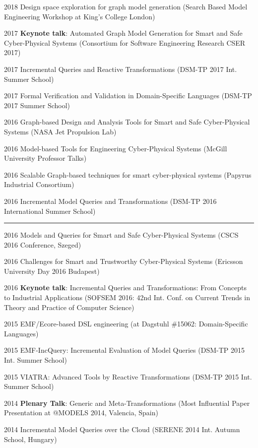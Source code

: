 \begin{yearlist}
\item[2018] Design space exploration for graph model generation  (Search Based Model Engineering Workshop at King's College London) 
\item[2017] \textbf{Keynote talk}: Automated Graph Model Generation for Smart and Safe Cyber-Physical Systems (Consortium for Software Engineering Research CSER 2017)
\item[2017] Incremental Queries and Reactive Transformations (DSM-TP 2017 Int. Summer School)
\item[2017] Formal Verification and Validation in Domain-Specific Languages (DSM-TP 2017 Summer School)
\item[2016] Graph-based  Design and Analysis Tools for Smart and Safe Cyber-Physical Systems (NASA Jet Propulsion Lab) 
\item[2016] Model-based Tools for Engineering Cyber-Physical Systems (McGill University Professor Talks)
\item[2016] Scalable  Graph-based techniques for smart cyber-physical systems (Papyrus Industrial Consortium)
\item[2016] Incremental Model Queries and Transformations (DSM-TP 2016 International Summer School) 
\newline
\rule{\linewidth}{0.2mm}
\item[2016] Models and Queries for Smart and Safe Cyber-Physical Systems (CSCS 2016 Conference, Szeged)
\item[2016] Challenges for Smart and Trustworthy Cyber-Physical Systems (Ericsson University Day 2016 Budapest)
\item[2016] \textbf{Keynote talk}: Incremental Queries and Transformations: From Concepts to Industrial Applications  (SOFSEM 2016: 42nd Int. Conf. on Current Trends in Theory and Practice of Computer Science) 
\item[2015] EMF/Ecore-based DSL engineering (at Dagstuhl \#15062:  Domain-Specific Languages)
\item[2015] EMF-IncQuery: Incremental Evaluation of Model Queries (DSM-TP 2015 Int. Summer School)  
\item[2015] VIATRA: Advanced Tools by Reactive Transformations (DSM-TP 2015 Int. Summer School) 
\item[2014] \textbf{Plenary Talk}: Generic and Meta-Transformations (Most Influential Paper Presentation at @MODELS 2014, Valencia, Spain)
\item[2014] Incremental Model Queries over the Cloud (SERENE 2014 Int. Autumn School, Hungary)

\end{yearlist}
